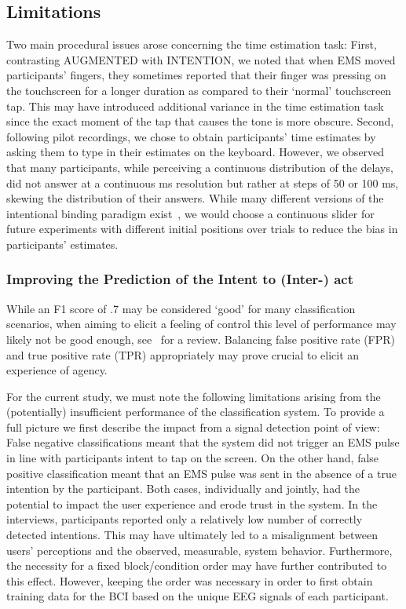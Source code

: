 \subsection{Limitations}
Two main procedural issues arose concerning the time estimation task: First, contrasting AUGMENTED with INTENTION, we noted that when EMS moved participants' fingers, they sometimes reported that their finger was pressing on the touchscreen for a longer duration as compared to their `normal' touchscreen tap. This may have introduced additional variance in the time estimation task since the exact moment of the tap that causes the tone is more obscure. Second, following pilot recordings, we chose to obtain participants' time estimates by asking them to type in their estimates on the keyboard. However, we observed that many participants, while perceiving a continuous distribution of the delays, did not answer at a continuous ms resolution but rather at steps of 50 or 100 ms, skewing the distribution of their answers. While many different versions of the intentional binding paradigm exist~\cite{Moore2012-dk}, we would choose a continuous slider for future experiments with different initial positions over trials to reduce the bias in participants' estimates.

\subsubsection{Improving the Prediction of the Intent to (Inter-) act}\label{improving_classifier}
While an F1 score of .7 may be considered `good' for many classification scenarios, when aiming to elicit a feeling of control this level of performance may likely not be good enough, see~\citet{Papenmeier2022-oi} for a review. Balancing false positive rate (FPR) and true positive rate (TPR) appropriately may prove crucial to elicit an experience of agency.

For the current study, we must note the following limitations arising from the (potentially) insufficient performance of the classification system. To provide a full picture we first describe the impact from a signal detection point of view: False negative classifications meant that the system did not trigger an EMS pulse in line with participants intent to tap on the screen. On the other hand, false positive classification meant that an EMS pulse was sent in the absence of a true intention by the participant. Both cases, individually and jointly, had the potential to impact the user experience and erode trust in the system. In the interviews, participants reported only a relatively low number of correctly detected intentions. This may have ultimately led to a misalignment between users' perceptions and the observed, measurable, system behavior. Furthermore, the necessity for a fixed block/condition order may have further contributed to this effect. However, keeping the order was necessary in order to first obtain training data for the BCI based on the unique EEG signals of each participant.


